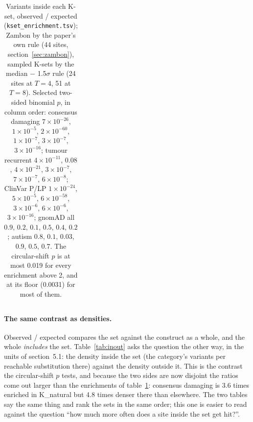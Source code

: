 \documentclass[11pt,a4paper]{article}
\newcommand{\file}[1]{\texttt{#1}}
\begin{document}
\begin{table}[H]
\begin{tabular}{@{}lrrrrrr@{}}
\bottomrule
\end{tabular}
\caption{Variants inside each K-set, observed / expected
(\file{kset\_enrichment.tsv}); Zambon by the paper's own rule (44 sites,
section~\ref{sec:zambon}), sampled K-sets by the median $-$ 1.5$\sigma$
rule (24 sites at $T=4$, 51 at $T=8$). Selected two-sided binomial $p$, in
column order: consensus damaging $7\times10^{-26}$, $1\times10^{-5}$,
$2\times10^{-60}$, $1\times10^{-7}$, $3\times10^{-7}$, $3\times10^{-16}$; tumour recurrent
$4\times10^{-11}$, $0.08$, $4\times10^{-21}$, $3\times10^{-7}$, $7\times10^{-7}$,
$6\times10^{-8}$; ClinVar P/LP $1\times10^{-24}$, $5\times10^{-5}$,
$6\times10^{-58}$, $3\times10^{-6}$, $6\times10^{-6}$, $3\times10^{-16}$; gnomAD all $0.9$,
$0.2$, $0.1$, $0.5$, $0.4$, $0.2$; autism $0.8$, $0.1$, $0.03$, $0.9$, $0.5$, $0.7$. The
circular-shift $p$ is at most 0.019 for every enrichment above 2, and at its
floor (0.0031) for most of them.}
\label{tab:enrich}
\end{table}

\paragraph{The same contrast as densities.} Observed / expected compares the
set against the construct as a whole, and the whole \emph{includes} the set.
Table~\ref{tab:inout} asks the question the other way, in the units of
section~5.1: the density inside the set (the category's variants per
reachable substitution there) against the density outside it. This is the
contrast the circular-shift $p$ tests, and because the two sides are now
disjoint the ratios come out larger than the enrichments of
table~\ref{tab:enrich}: consensus damaging is 3.6 times enriched in
K\_natural but 4.8 times denser there than elsewhere. The two tables say the
same thing and rank the sets in the same order; this one is easier to read
against the question ``how much more often does a site inside the set get
hit?''.
\end{document}
